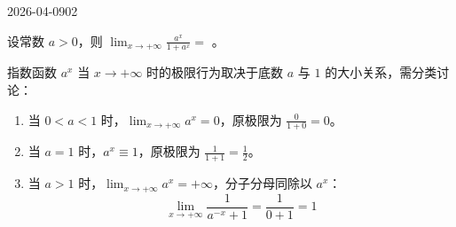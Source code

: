 \begin{mistake}{2026-04-09}{02}

\begin{problemcontent}
设常数 \( a > 0 \)，则 \( \lim_{x \to +\infty} \frac{a^x}{1+a^x} = \) \underline{\hspace{2em}}。
\end{problemcontent}

\begin{solutioncontent}
指数函数 \(a^x\) 当 \(x \to +\infty\) 时的极限行为取决于底数 \(a\) 与 \(1\) 的大小关系，需分类讨论：

\begin{enumerate}
 \item 当 \(0 < a < 1\) 时，\(\lim_{x \to +\infty} a^x = 0\)，原极限为 \(\frac{0}{1+0} = 0\)。
 \item 当 \(a = 1\) 时，\(a^x \equiv 1\)，原极限为 \(\frac{1}{1+1} = \frac{1}{2}\)。
 \item 当 \(a > 1\) 时，\(\lim_{x \to +\infty} a^x = +\infty\)，分子分母同除以 \(a^x\)：
 \[\lim_{x \to +\infty} \frac{1}{a^{-x} + 1} = \frac{1}{0 + 1} = 1\]
\end{enumerate}
\end{solutioncontent}


\end{mistake}
